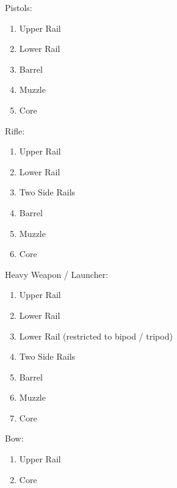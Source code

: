 \begin{multicols}{2}
Pistols:
\vspace{-8mm}
\begin{enumerate}
	\setlength\itemsep{-8mm}
	\item Upper Rail
	\item Lower Rail
	\item Barrel
	\item Muzzle
	\item Core
\end{enumerate}

Rifle:
\vspace{-8mm}
\begin{enumerate}
	\setlength\itemsep{-8mm}
	\item Upper Rail
	\item Lower Rail
	\item Two Side Rails
	\item Barrel
	\item Muzzle
	\item Core
\end{enumerate}

Heavy Weapon / Launcher:
\vspace{-8mm}
\begin{enumerate}
	\setlength\itemsep{-8mm}
	\item Upper Rail
	\item Lower Rail
	\item Lower Rail (restricted to bipod / tripod)
	\item Two Side Rails
	\item Barrel
	\item Muzzle
	\item Core
\end{enumerate}

Bow:
\vspace{-8mm}
\begin{enumerate}
	\setlength\itemsep{-8mm}
	\item Upper Rail
	\item Core
\end{enumerate}
\end{multicols}

